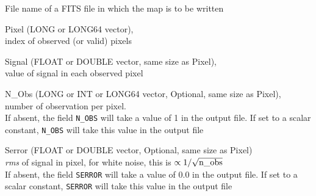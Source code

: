 \begin{qualifiers}
  \begin{qulist}{} %
 	\item[{File}] 
          name of a FITS file in which the map is to be written

 	\item[{Pixel}] 
	 (LONG or LONG64 vector), \\ index of observed (or valid) pixels

 	\item[{Signal}]  
	 (FLOAT or DOUBLE vector, same size as Pixel), \\ value of signal in each observed pixel

 	\item[{N\_Obs}]  
	 (LONG or INT or LONG64 vector, Optional, same size as Pixel), \\ number of
	 observation per pixel. \\
         If absent, the field {\tt N\_OBS} will take a value of 1 in the output file.
         If set to a scalar constant, {\tt N\_OBS} will take this value in the
	 output file

 	\item[{Serror}]  
	 (FLOAT or DOUBLE vector, Optional, same size as Pixel)\\ {\em rms} of signal in pixel, for white noise,
                   this is $\propto 1/\sqrt{{\rm n\_obs}}$ \\
         If absent, the field {\tt SERROR} will take a value of 0.0 in the output file.
         If set to a scalar constant, {\tt SERROR} will take this value in the
	 output file

  \end{qulist}
\end{qualifiers}

